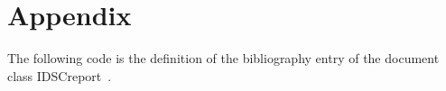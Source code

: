 
\chapter{Appendix}
\label{chp:appendix}

The following code is the definition of the bibliography entry of the document class IDSCreport~\cite{IDSCreportClass:2021manual}.

%